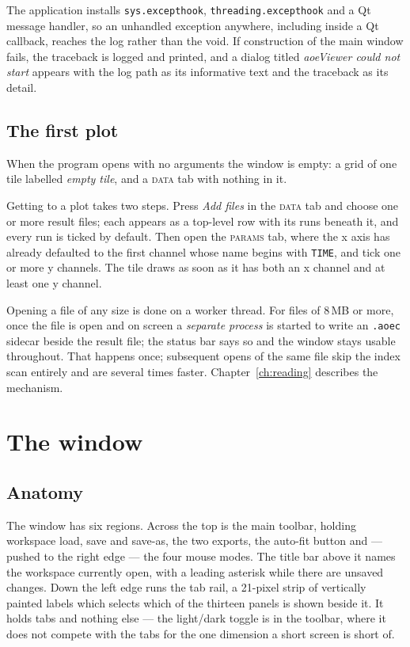 \documentclass[11pt,a4paper,oneside]{report}
\newcommand{\code}[1]{\texttt{#1}}
\newcommand{\tab}[1]{\textsc{#1}}
\begin{document}
The application installs \code{sys.excepthook},
\code{threading.excepthook} and a Qt message handler, so an unhandled exception
anywhere, including inside a Qt callback, reaches the log rather than the void.
If construction of the main window fails, the traceback is logged and printed,
and a dialog titled \emph{aoeViewer could not start} appears with the log path as
its informative text and the traceback as its detail.

\section{The first plot}

When the program opens with no arguments the window is empty: a grid of one tile
labelled \emph{empty tile}, and a \tab{data} tab with nothing in it.

Getting to a plot takes two steps. Press \emph{Add files} in the \tab{data} tab
and choose one or more result files; each appears as a top-level row with its
runs beneath it, and every run is ticked by default. Then open the \tab{params}
tab, where the x axis has already defaulted to the first channel whose name
begins with \code{TIME}, and tick one or more y channels. The tile draws as soon
as it has both an x channel and at least one y channel.

Opening a file of any size is done on a worker thread. For files of 8\,MB or
more, once the file is open and on screen a \emph{separate process} is started
to write an \code{.aoec} sidecar beside the result file; the status bar says so
and the window stays usable throughout. That happens once; subsequent opens of
the same file skip the index scan entirely and are several times faster.
Chapter~\ref{ch:reading} describes the mechanism.

\chapter{The window}

\section{Anatomy}

The window has six regions. Across the top is the main toolbar, holding
workspace load, save and save-as, the two exports, the auto-fit button and ---
pushed to the right edge --- the four mouse modes. The title bar above it names
the workspace currently open, with a leading asterisk while there are unsaved
changes. Down the left edge runs the tab rail, a 21-pixel strip of vertically
painted labels which selects which of the thirteen panels is shown beside it.
It holds tabs and nothing else --- the light/dark toggle is in the toolbar,
where it does not compete with the tabs for the one dimension a short screen is
short of.
\end{document}
